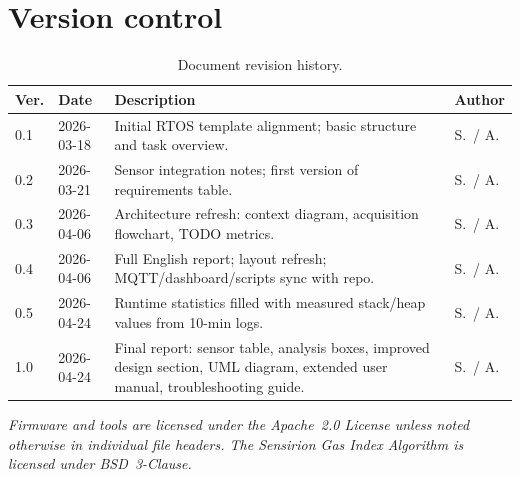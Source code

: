 \documentclass[11pt,a4paper]{article}
\newcommand{\rowhdr}{\rowcolor{tablehdr}}
\begin{document}
\newpage
\section{Version control}
\vspace{10pt}
{\footnotesize
\setlength{\tabcolsep}{4pt}
\renewcommand{\arraystretch}{1.1}

\setlength\LTleft{0pt}
\begin{longtable}{@{}p{1.0cm}p{2.2cm}p{10.6cm}p{1.5cm}@{}}
\caption{Document revision history.\label{tab:version_history}}\\
\rowhdr
\textbf{Ver.} & \textbf{Date} & \textbf{Description} & \textbf{Author} \\
\midrule
\endhead
0.1 & 2026-03-18 & Initial RTOS template alignment; basic structure and task overview. & S.\ / A. \\
0.2 & 2026-03-21 & Sensor integration notes; first version of requirements table. & S.\ / A. \\
0.3 & 2026-04-06 & Architecture refresh: context diagram, acquisition flowchart, TODO metrics. & S.\ / A. \\
0.4 & 2026-04-06 & Full English report; layout refresh; MQTT/dashboard/scripts sync with repo. & S.\ / A. \\
0.5 & 2026-04-24 & Runtime statistics filled with measured stack/heap values from 10-min logs. & S.\ / A. \\
1.0 & 2026-04-24 & Final report: sensor table, analysis boxes, improved design section,
                   UML diagram, extended user manual, troubleshooting guide. & S.\ / A. \\
\bottomrule
\end{longtable}
}
\vspace{1.2em}
\noindent\textit{Firmware and tools are licensed under the Apache~2.0 License unless noted
otherwise in individual file headers. The Sensirion Gas Index Algorithm is licensed under
BSD~3-Clause.}
\end{document}

